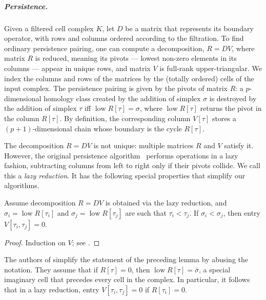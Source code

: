 \documentclass[cleveref,a4paper,english,nolineno]{socg-lipics-v2021}
\renewcommand{\paragraph}[1]{\subparagraph*{#1}}
\newcommand{\low}{\operatorname{low}}
\newcommand{\ssx}{\sigma}
\newcommand{\tsx}{\tau}
\begin{document}
\paragraph{Persistence.}
Given a filtered cell complex $K$, let $D$ be a matrix that represents its
boundary operator, with rows and columns ordered according to the filtration.
To find ordinary persistence pairing, one can compute a decomposition, $R =
DV$, where matrix $R$ is reduced, meaning its pivots --- lowest non-zero
elements in its columns --- appear in unique rows, and
matrix $V$ is full-rank upper-triangular. We index the columns and rows of the
matrices by the (totally ordered) cells of the input complex.
The persistence pairing is given by
the pivots of matrix $R$: a $p$-dimensional homology class created by the
addition of simplex $\ssx$ is destroyed by the addition of simplex $\tsx$ iff
$\low R[\tsx] = \ssx$, where $\low R[\tsx]$ returns the pivot in the column
$R[\tsx]$. By definition, the corresponding column $V[\tsx]$ stores a
$(p+1)$-dimensional chain whose boundary is the cycle $R[\tsx]$.

The decomposition $R=DV$ is not unique: multiple matrices $R$ and $V$ satisfy
it. However, the original persistence algorithm~\cite{ELZ02} performs operations
in a lazy fashion, subtracting columns from left to right only if their pivots
collide. We call this a \emph{lazy reduction}. It has the following special
properties that simplify our algorithms.

\begin{lemma}
    \label{lem:lazy-reduction}
    Assume decomposition $R = DV$ is obtained via the lazy reduction,
    and $\ssx_i = \low R[\tsx_i]$ and $\ssx_j = \low R[\tsx_j]$
    are such that $\tsx_i < \tsx_j$. If $\ssx_i < \ssx_j$,
    then entry $V[\tsx_i,\tsx_j] = 0$.
\end{lemma}
\begin{proof}
    Induction on $V$; see \cite{NM24}.
\end{proof}

\begin{remark}
    The authors of \cite{NM24} simplify the statement of the preceding lemma by
    abusing the notation. They assume that
    if $R[\tsx] = 0$, then $\low R[\tsx] = \bar{\ssx}$, a special imaginary cell
    that precedes every cell in the complex. In particular, it follows that
    in a lazy reduction, entry $V[\tsx_i, \tsx_j] = 0$ if $R[\tsx_i] = 0$.
\end{remark}
\end{document}
